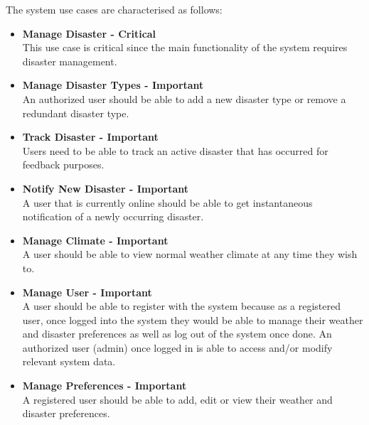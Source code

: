 The system use cases are characterised as follows:
 \begin{itemize}

 	\item \textbf{Manage Disaster - Critical}\\ This use case is critical since the main functionality of the system requires disaster management.
 	\item \textbf{Manage Disaster Types - Important}\\ An authorized user should be able to add a new disaster type or remove a redundant disaster type.
	\item \textbf{Track Disaster - Important}\\ Users need to be able to track an active disaster that has occurred for feedback purposes. 
 	\item \textbf{Notify New Disaster - Important}\\ A user that is currently online should be able to get instantaneous notification of a newly occurring disaster.
 	\item \textbf{Manage Climate - Important}\\ A user should be able to view normal weather climate at any time they wish to.
 	\item \textbf{Manage User - Important} \\ A user should be able to register with the system because as a registered user, once logged into the system they would be able to manage their weather and disaster preferences as well as log out of the system once done. An authorized user (admin) once logged in is able to access and/or modify relevant system data.
	\item \textbf{Manage Preferences - Important} \\ A registered user should be able to add, edit or view their weather and disaster preferences.  
 \end{itemize}